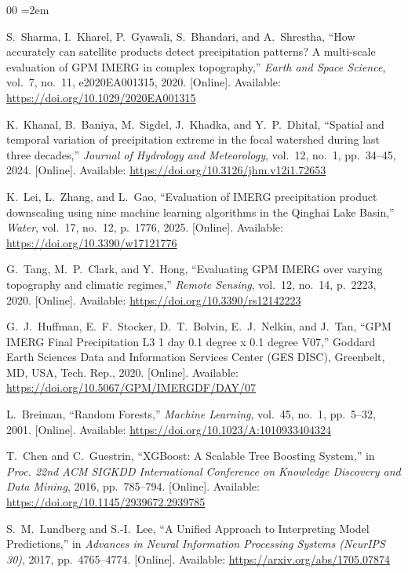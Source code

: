 \documentclass[conference]{IEEEtran}
\begin{document}
\FloatBarrier
\begin{thebibliography}{00}
\footnotesize
\setlength{\itemsep}{2pt plus 0.5pt}
\setlength{\parskip}{0pt}
\emergencystretch=2em

S.~Sharma, I.~Kharel, P.~Gyawali, S.~Bhandari, and A.~Shrestha, ``How accurately can satellite products detect precipitation patterns? A multi-scale evaluation of GPM IMERG in complex topography,'' \emph{Earth and Space Science}, vol.~7, no.~11, e2020EA001315, 2020. [Online]. Available: \url{https://doi.org/10.1029/2020EA001315}

K.~Khanal, B.~Baniya, M.~Sigdel, J.~Khadka, and Y.~P.~Dhital, ``Spatial and temporal variation of precipitation extreme in the focal watershed during last three decades,'' \emph{Journal of Hydrology and Meteorology}, vol.~12, no.~1, pp.~34--45, 2024. [Online]. Available: \url{https://doi.org/10.3126/jhm.v12i1.72653}

K.~Lei, L.~Zhang, and L.~Gao, ``Evaluation of IMERG precipitation product downscaling using nine machine learning algorithms in the Qinghai Lake Basin,'' \emph{Water}, vol.~17, no.~12, p.~1776, 2025. [Online]. Available: \url{https://doi.org/10.3390/w17121776}

G.~Tang, M.~P.~Clark, and Y.~Hong, ``Evaluating GPM IMERG over varying topography and climatic regimes,'' \emph{Remote Sensing}, vol.~12, no.~14, p.~2223, 2020. [Online]. Available: \url{https://doi.org/10.3390/rs12142223}

G.~J.~Huffman, E.~F.~Stocker, D.~T.~Bolvin, E.~J.~Nelkin, and J.~Tan, ``GPM IMERG Final Precipitation L3 1 day 0.1 degree x 0.1 degree V07,'' Goddard Earth Sciences Data and Information Services Center (GES DISC), Greenbelt, MD, USA, Tech. Rep., 2020. [Online]. Available: \url{https://doi.org/10.5067/GPM/IMERGDF/DAY/07}

L.~Breiman, ``Random Forests,'' \emph{Machine Learning}, vol.~45, no.~1, pp.~5--32, 2001. [Online]. Available: \url{https://doi.org/10.1023/A:1010933404324}

T.~Chen and C.~Guestrin, ``XGBoost: A Scalable Tree Boosting System,'' in \emph{Proc. 22nd ACM SIGKDD International Conference on Knowledge Discovery and Data Mining}, 2016, pp.~785--794. [Online]. Available: \url{https://doi.org/10.1145/2939672.2939785}

S.~M.~Lundberg and S.-I.~Lee, ``A Unified Approach to Interpreting Model Predictions,'' in \emph{Advances in Neural Information Processing Systems (NeurIPS 30)}, 2017, pp.~4765--4774. [Online]. Available: \url{https://arxiv.org/abs/1705.07874}


\end{thebibliography}
\end{document}
